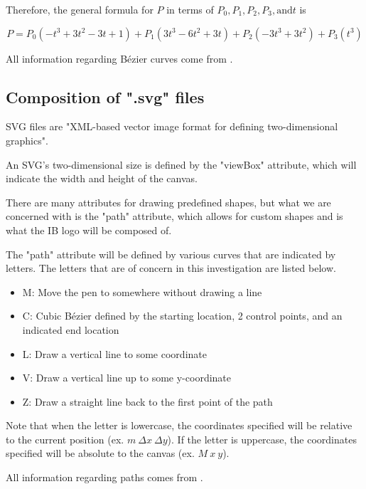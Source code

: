 \documentclass[letterpaper, 12pt]{article}
\begin{document}
Therefore, the general formula for \(P\) in terms of
\(P_0, P_1, P_2, P_3, \text{and} t\) is

\begin{equation} \label{eq:pFormula}
    P = P_0(-t^3+3t^2-3t+1) + P_1(3t^3-6t^2+3t) + P_2(-3t^3+3t^2) + P_3(t^3)
\end{equation}

All information regarding Bézier curves come from \cite{holmerBeautyBezierCurves2021}.

\subsection{Composition of ".svg" files}

SVG files are "XML-based vector image format for defining two-dimensional
graphics"\cite{SVG2023}.

An SVG's two-dimensional size is defined by the "viewBox" attribute,
which will indicate the width and height of the canvas.

There are many attributes for drawing predefined shapes, but what
we are concerned with is the "path" attribute, which allows for custom
shapes and is what the IB logo will be composed of.

The "path" attribute will be defined by various curves that are indicated
by letters. The letters that are of concern in this investigation are
listed below.
\begin{itemize}
    \item M: Move the pen to somewhere without drawing a line
    \item C: Cubic Bézier defined by the starting location, 2 control points, and an indicated end location
    \item L: Draw a vertical line to some coordinate
    \item V: Draw a vertical line up to some y-coordinate
    \item Z: Draw a straight line back to the first point of the path
\end{itemize}

Note that when the letter is lowercase, the coordinates specified will
be relative to the current position (ex. \(m~\Delta x~\Delta y\)). If the letter is uppercase, the
coordinates specified will be absolute to the canvas (ex. \(M~x~y\)).

All information regarding paths comes from \cite{mozilladevelopernetworkPathsSVGScalable2023}.
\end{document}
